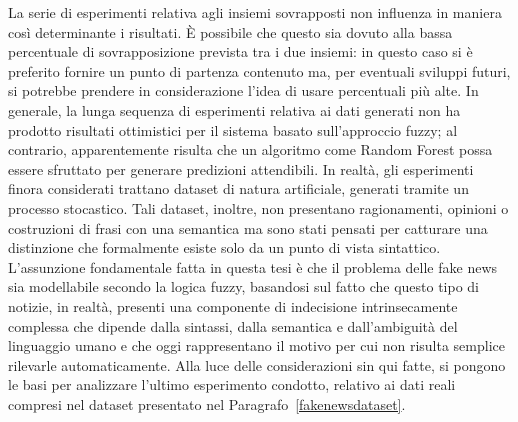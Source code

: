 \documentclass[12pt]{report}
\theoremstyle{definition}
\begin{document}
La serie di esperimenti relativa agli insiemi sovrapposti non influenza in maniera così determinante i risultati.
È possibile che questo sia dovuto alla bassa percentuale di sovrapposizione prevista tra i due insiemi: in questo caso si è preferito fornire un punto di partenza contenuto ma, per eventuali sviluppi futuri, si potrebbe prendere in considerazione l'idea di usare percentuali più alte. 
In generale, la lunga sequenza di esperimenti relativa ai dati generati non ha prodotto risultati ottimistici per il sistema basato sull'approccio fuzzy; al contrario, apparentemente risulta che un algoritmo come Random Forest possa essere sfruttato per generare predizioni attendibili.
In realtà, gli esperimenti finora considerati trattano dataset di natura artificiale, generati tramite un processo stocastico. Tali dataset, inoltre, non presentano ragionamenti, opinioni o costruzioni di frasi con una semantica ma sono stati pensati per catturare una distinzione che formalmente esiste solo da un punto di vista sintattico.
L'assunzione fondamentale fatta in questa tesi è che il problema delle fake news sia modellabile secondo la logica fuzzy, basandosi sul fatto che questo tipo di notizie, in realtà, presenti una componente di indecisione intrinsecamente complessa che dipende dalla sintassi, dalla semantica e dall'ambiguità del linguaggio umano e che oggi rappresentano il motivo per cui non risulta semplice rilevarle automaticamente.
Alla luce delle considerazioni sin qui fatte, si pongono le basi per analizzare l'ultimo esperimento condotto, relativo ai dati reali compresi nel dataset presentato nel Paragrafo~\ref{fakenewsdataset}.
\end{document}
